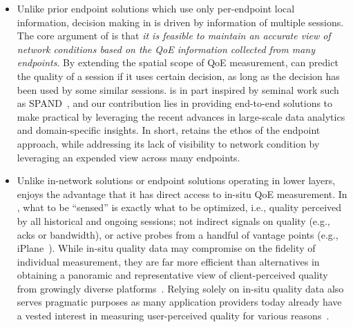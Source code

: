 \begin{itemize}

\item Unlike prior endpoint solutions which use only per-endpoint local 
information, decision making in \ddn is driven by information of multiple sessions. 
The core argument of \ddn is that {\em it is feasible to
maintain an accurate view of network conditions based on the QoE information
collected from many endpoints}.
By extending the spatial scope of QoE measurement, 
\ddn can predict the quality of a session if it uses certain decision, 
as long as the decision has been used by 
some similar sessions.
\ddn is in part inspired by seminal work such as SPAND~\cite{spand},
and our contribution lies in providing end-to-end solutions to make \ddn
practical by leveraging the recent advances
in large-scale data analytics and domain-specific insights.
In short, \ddn retains the ethos of the endpoint approach, 
while addressing its lack of
visibility to network condition by leveraging an expended view 
across many endpoints.

\item Unlike in-network solutions or endpoint solutions operating 
in lower layers, \ddn enjoys the advantage that it has  
direct access to in-situ QoE measurement.
In \ddn, what to be ``sensed'' is exactly what to be optimized, 
i.e., quality perceived by all historical and ongoing sessions; 
not indirect signals on quality (e.g., acks 
or bandwidth), or active probes from a handful 
of vantage points (e.g., iPlane~\cite{iplaneosdi}). 
While in-situ quality data may compromise on the fidelity of 
individual measurement, they are far more efficient than 
alternatives in obtaining a panoramic and representative
 view of client-perceived quality from growingly diverse platforms~\cite{insitu}.
Relying solely on in-situ quality data also serves pragmatic 
purposes as many application providers today already have 
a vested interest in measuring user-perceived quality for 
various reasons~\cite{sigcomm-qoe-workshop}.

\end{itemize}







